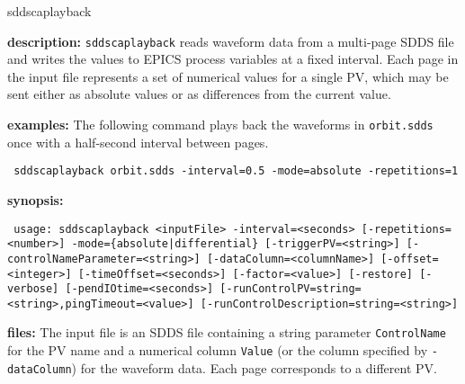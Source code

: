 %
%
\begin{sddsprog}{sddscaplayback}
\item \textbf{description:}
\verb+sddscaplayback+ reads waveform data from a multi-page SDDS file and writes the values to
EPICS process variables at a fixed interval. Each page in the input file represents a set of
numerical values for a single PV, which may be sent either as absolute values or as differences
from the current value.

\item \textbf{examples:}
The following command plays back the waveforms in \verb+orbit.sdds+ once with a half-second
interval between pages.
\begin{flushleft}{\tt
sddscaplayback orbit.sdds -interval=0.5 -mode=absolute -repetitions=1
}\end{flushleft}

\item \textbf{synopsis:}
\begin{flushleft}{\tt
usage: sddscaplayback <inputFile> -interval=<seconds> [-repetitions=<number>]\
-mode=\{absolute|differential\} [-triggerPV=<string>] [-controlNameParameter=<string>]\
[-dataColumn=<columnName>] [-offset=<integer>] [-timeOffset=<seconds>]\
[-factor=<value>] [-restore] [-verbose] [-pendIOtime=<seconds>]\
[-runControlPV=string=<string>,pingTimeout=<value>]\
[-runControlDescription=string=<string>]
}\end{flushleft}

\item \textbf{files:}
The input file is an SDDS file containing a string parameter \verb+ControlName+ for the PV name
and a numerical column \verb+Value+ (or the column specified by \verb+-dataColumn+) for the
waveform data. Each page corresponds to a different PV.


\end{sddsprog}
